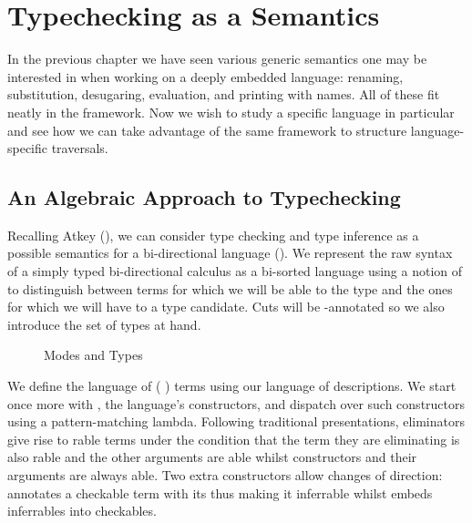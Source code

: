 \chapter{Typechecking as a Semantics}

In the previous chapter we have seen various generic semantics one may be interested in
when working on a deeply embedded language: renaming, substitution, desugaring,
evaluation, and printing with names. All of these fit neatly in the 
framework. Now we wish to study a specific language in particular and see how we can
take advantage of the same framework to structure language-specific traversals.

\section{An Algebraic Approach to Typechecking}\label{section:typechecking}

Recalling Atkey (\citeyear{atkey2015algebraic}), we can consider type checking
and type inference as a possible semantics for a bi-directional language
(\cite{pierce2000local}). We represent the raw syntax of a simply typed bi-directional
calculus as a bi-sorted language using a notion of  to distinguish between
terms for which we will be able to  the type and the ones for which we will
have to  a type candidate. Cuts will be -annotated so we also
introduce the set of types at hand.

\begin{figure}[h]
\begin{minipage}{0.5\textwidth}
\end{minipage}\begin{minipage}{0.5\textwidth}
\end{minipage}
\caption{Modes and Types}
\end{figure}

We define the language of ({ }) terms using our language of
descriptions. We start once more with , the language's constructors,
and dispatch over such constructors using a pattern-matching lambda. Following
traditional presentations, eliminators give rise to rable terms under
the condition that the term they are eliminating is also rable and
the other arguments are able whilst constructors and their arguments
are always able. Two extra constructors allow changes of direction:
 annotates a checkable term with its  thus making it inferrable
whilst  embeds inferrables into checkables.


